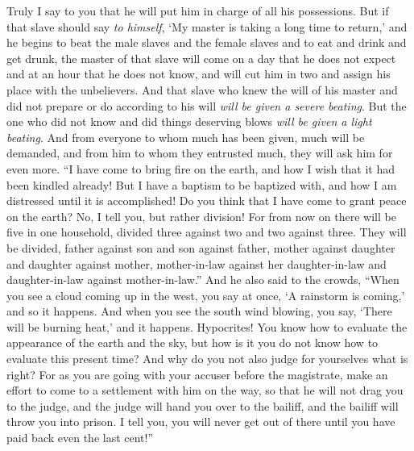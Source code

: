 \begin{biblechapter}
\verse Truly I say to you that he will put him in charge of all his possessions.
\verse But if that slave should say \textit{to himself}, ‘My master is taking a long time to return,’ and he begins to beat the male slaves and the female slaves and to eat and drink and get drunk,
\verse the master of that slave will come on a day that he does not expect and at an hour that he does not know, and will cut him in two and assign his place with the unbelievers.
\verse And that slave who knew the will of his master and did not prepare or do according to his will \textit{will be given a severe beating}.
\verse But the one who did not know and did things deserving blows \textit{will be given a light beating}. And from everyone to whom much has been given, much will be demanded, and from him to whom they entrusted much, they will ask him for even more.
 “I have come to bring fire on the earth, and how I wish that it had been kindled already!
\verse But I have a baptism to be baptized with, and how I am distressed until it is accomplished!
\verse Do you think that I have come to grant peace on the earth? No, I tell you, but rather division!
\verse For from now on there will be five in one household, divided three against two and two against three.
\verse They will be divided, father against son and son against father, mother against daughter and daughter against mother, mother-in-law against her daughter-in-law and daughter-in-law against mother-in-law.”
 And he also said to the crowds, “When you see a cloud coming up in the west, you say at once, ‘A rainstorm is coming,’ and so it happens.
\verse And when you see the south wind blowing, you say, ‘There will be burning heat,’ and it happens.
\verse Hypocrites! You know how to evaluate the appearance of the earth and the sky, but how is it you do not know how to evaluate this present time?
 And why do you not also judge for yourselves what is right?
\verse For as you are going with your accuser before the magistrate, make an effort to come to a settlement with him on the way, so that he will not drag you to the judge, and the judge will hand you over to the bailiff, and the bailiff will throw you into prison.
\verse I tell you, you will never get out of there until you have paid back even the last cent!”
\end{biblechapter}

